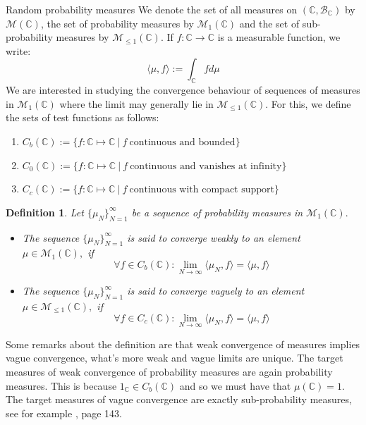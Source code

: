 \documentclass[11pt, a4paper, oneside]{book}
\numberwithin{equation}{chapter}
\newtheorem{definition}{Definition}[section]
\begin{document}
\begin{section}{Random probability measures}
We denote the set of all measures on $(\mathbb{C},\mathcal{B}_{\mathbb{C}})$ by $\mathcal{M}(\mathbb{C})$, the set of probability measures by $\mathcal{M}_1(\mathbb{C})$ and the set of sub-probability measures by $\mathcal{M}_{\leq 1} (\mathbb{C})$. If $f:\mathbb{C} \to \mathbb{C}$ is a measurable function, we write:
\[
\langle \mu, f \rangle := \int_{\mathbb{C}} f d\mu
\]
%
We are interested in studying the convergence behaviour of sequences of measures in $\mathcal{M}_{1}(\mathbb{C})$ where the limit may generally lie in $\mathcal{M}_{\leq 1}(\mathbb{C})$. For this, we define the sets of test functions as follows:
\begin{enumerate}
    \item $C_b(\mathbb{C}) := \{ f: \mathbb{C}\mapsto \mathbb{C} \ | \ f \ \text{continuous and bounded}\}$
    \item $C_0(\mathbb{C}) :=  \{ f: \mathbb{C}\mapsto \mathbb{C} \ | \ f \ \text{continuous and vanishes at infinity}\}$
    \item $C_c(\mathbb{C}) :=  \{ f: \mathbb{C}\mapsto \mathbb{C} \ | \ f \ \text{continuous with compact support} \}$
\end{enumerate}
%
\begin{definition}
Let $\{\mu_N\}_{N=1}^\infty$ be a sequence of probability measures in $\mathcal{M}_1(\mathbb{C}).$
\begin{itemize}
    \item The sequence $\{\mu_N\}_{N=1}^\infty$ is said to converge weakly to an element $\mu \in \mathcal{M}_1(\mathbb{C}),$ if
    \[
    \forall f \in C_b(\mathbb{C}): \lim \limits_{N \to \infty} \langle \mu_N,f \rangle = \langle \mu,f \rangle
    \]
    \item The sequence $\{\mu_N\}_{N=1}^\infty$ is said to converge vaguely to an element $\mu \in \mathcal{M}_{\leq 1}(\mathbb{C}),$ if
    \[
    \forall f \in C_c(\mathbb{C}): \lim \limits_{N \to \infty} \langle \mu_N,f \rangle = \langle \mu,f \rangle
    \]
\end{itemize}
\end{definition}
%
Some remarks about the definition are that weak convergence of measures implies vague convergence, what's more weak and vague limits are unique. The target measures of weak convergence of probability measures are again probability measures. This is because $1_{\mathbb{C}} \in C_b(\mathbb{C})$ and so we must have that $\mu(\mathbb{C})=1.$ The target measures of vague convergence are exactly sub-probability measures, see for example \cite{kallenberg1997foundations}, page 143.


\end{section}
\end{document}
